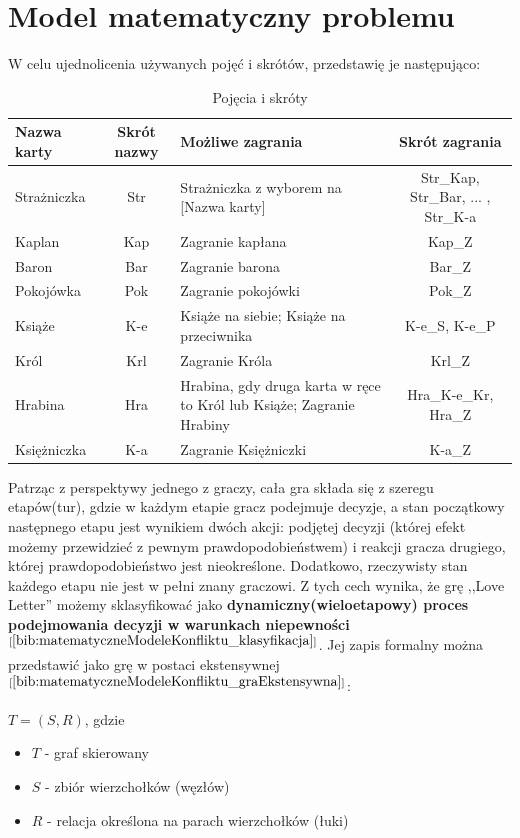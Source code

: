 \section{Model matematyczny problemu}
W celu ujednolicenia używanych pojęć i skrótów, przedstawię je następująco:

\clearpage
\begin{table}[t]
	\caption{Pojęcia i skróty}
	\centering
	\begin{tabular}{|l|c|p{4cm}|c|}
		\hline
		\bf{Nazwa karty} & \bf{Skrót nazwy}  & \bf{Możliwe zagrania} & \bf{Skrót zagrania} \\ \hline
		Strażniczka & Str & Strażniczka z wyborem na [Nazwa karty] & Str\_Kap, Str\_Bar, ... , Str\_K-a  \\ \hline
		Kaplan & Kap & Zagranie kapłana & Kap\_Z \\ \hline
		Baron & Bar & Zagranie barona & Bar\_Z  \\ \hline
		Pokojówka & Pok & Zagranie pokojówki & Pok\_Z \\ \hline
		Książe & K-e & Książe na siebie; Książe na przeciwnika & K-e\_S, K-e\_P  \\ \hline
		Król & Krl & Zagranie Króla & Krl\_Z \\ \hline
		Hrabina & Hra & Hrabina, gdy druga karta w ręce to Król lub Książe; Zagranie Hrabiny & Hra\_K-e\_Kr, Hra\_Z \\ \hline
		Księżniczka & K-a & Zagranie Księżniczki & K-a\_Z \\ \hline
	\end{tabular}
\end{table}

Patrząc z perspektywy jednego z graczy, cała gra składa się z szeregu etapów(tur), gdzie w każdym etapie gracz podejmuje decyzje, a stan początkowy następnego etapu jest wynikiem dwóch akcji: podjętej decyzji (której efekt możemy przewidzieć z pewnym prawdopodobieństwem) i reakcji gracza drugiego, której prawdopodobieństwo jest nieokreślone. Dodatkowo, rzeczywisty stan każdego etapu nie jest w pełni znany graczowi. Z tych cech wynika, że grę ,,Love Letter'' możemy sklasyfikować jako \textbf{dynamiczny(wieloetapowy) proces podejmowania decyzji w warunkach niepewności}$^{[\ref{bib:matematyczneModeleKonfliktu_klasyfikacja}]}$. Jej zapis formalny można przedstawić jako grę w postaci ekstensywnej$^{[\ref{bib:matematyczneModeleKonfliktu_graEkstensywna}]}$:
\begin{center}
	$T = (S,R)$, gdzie
	\begin{itemize}
		\item $T$ - graf skierowany
		\item $S$ - zbiór wierzchołków (węzłów)
		\item $R$ - relacja określona na parach wierzchołków (łuki)
	\end{itemize}
\end{center}

